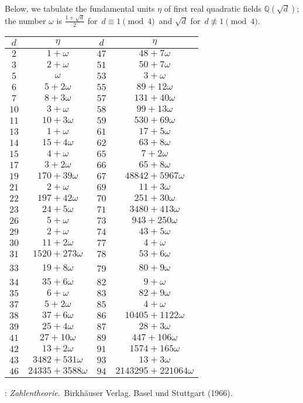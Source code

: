 \documentclass[12pt]{article}
\theoremstyle{definition}
\begin{document}
Below, we tabulate the fundamental units $\eta$ of first real quadratic fields $\mathbb{Q}(\sqrt{d})$; the number $\omega$ is $\displaystyle\frac{1\!+\!\sqrt{d}}{2}$ for\, 
$d \equiv 1 \pmod{4}$\, and $\sqrt{d}$ for\, $d \not\equiv 1 \pmod{4}$.


\begin{center}
\begin{tabular}{||c|c||c|c||}
\hline\hline
$d$ & $\eta$ & $d$ & $\eta$\\

\hline\hline
$2$ & $1+\omega$ & $47$ & $48+7\omega$\\
\hline
$3$ & $2+\omega$ & $51$ & $50+7\omega$\\
\hline
$5$ & $\omega$ & $53$ & $3+\omega$\\
\hline
$6$ & $5+2\omega$ & $55$ & $89+12\omega$\\
\hline
$7$ & $8+3\omega$ & $57$ & $131+40\omega$\\
\hline
$10$ & $3+\omega$ & $58$ & $99+13\omega$\\
\hline
$11$ & $10+3\omega$ & $59$ & $530+69\omega$\\
\hline
$13$ & $1+\omega$ & $61$ & $17+5\omega$\\
\hline
$14$ & $15+4\omega$ & $62$ & $63+8\omega$\\
\hline
$15$ & $4+\omega$ & $65$ & $7+2\omega$\\
\hline
$17$ & $3+2\omega$ & $66$ & $65+8\omega$\\
\hline
$19$ & $170+39\omega$ & $67$ & $48842+5967\omega$\\
\hline
$21$ & $2+\omega$ & $69$ & $11+3\omega$\\
\hline
$22$ & $197+42\omega$ & $70$ & $251+30\omega$\\
\hline
$23$ & $24+5\omega$ & $71$ & $3480+413\omega$\\
\hline
$26$ & $5+\omega$ & $73$ & $943+250\omega$\\
\hline
$29$ & $2+\omega$ & $74$ & $43+5\omega$\\
\hline
$30$ & $11+2\omega$ & $77$ & $4+\omega$\\
\hline
$31$ & $1520+273\omega$ & $78$ & $53+6\omega$\\
\hline
$33$ & $19+8\omega$ & 79 & $80+9\omega$\\
\hline
$34$ & $35+6\omega$ & $82$ & $9+\omega$\\
\hline
$35$ & $6+\omega$ & $83$ & $82+9\omega$\\
\hline
$37$ & $5+2\omega$ & $85$ & $4+\omega$\\
\hline
$38$ & $37+6\omega$ & $86$ & $10405+1122\omega$\\
\hline
$39$ & $25+4\omega$ & $87$ & $28+3\omega$\\
\hline
$41$ & $27+10\omega$ & $89$ & $447+106\omega$\\
\hline
$42$ & $13+2\omega$ & $91$ & $1574+165\omega$\\
\hline
$43$ & $3482+531\omega$ & $93$ & $13+3\omega$\\
\hline
$46$ & $24335+3588\omega$ & $94$ & $2143295+221064\omega$\\
\hline
\end{tabular}
\end{center}

\begin{thebibliography}{9}
: {\em Zahlentheorie}.\, Birkh\"auser Verlag. Basel und Stuttgart (1966).
\end{thebibliography}

\end{document}
